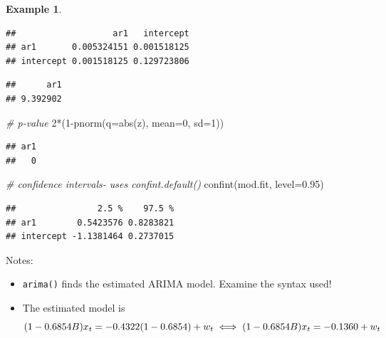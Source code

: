 \documentclass[
]{book}
\newenvironment{Shaded}{\begin{snugshade}}{\end{snugshade}}
\newcommand{\AttributeTok}[1]{\textcolor[rgb]{0.77,0.63,0.00}{#1}}
\newcommand{\CommentTok}[1]{\textcolor[rgb]{0.56,0.35,0.01}{\textit{#1}}}
\newcommand{\DecValTok}[1]{\textcolor[rgb]{0.00,0.00,0.81}{#1}}
\newcommand{\FloatTok}[1]{\textcolor[rgb]{0.00,0.00,0.81}{#1}}
\newcommand{\FunctionTok}[1]{\textcolor[rgb]{0.00,0.00,0.00}{#1}}
\newcommand{\NormalTok}[1]{#1}
\newcommand{\OtherTok}[1]{\textcolor[rgb]{0.56,0.35,0.01}{#1}}
\newcommand{\SpecialCharTok}[1]{\textcolor[rgb]{0.00,0.00,0.00}{#1}}
\providecommand{\tightlist}{%
  \setlength{\itemsep}{0pt}\setlength{\parskip}{0pt}}
\theoremstyle{definition}
\theoremstyle{definition}
\newtheorem{example}{Example}[chapter]
\theoremstyle{definition}
\theoremstyle{definition}
\theoremstyle{remark}
\begin{document}
\begin{example}
\begin{verbatim}
##                   ar1   intercept
## ar1       0.005324151 0.001518125
## intercept 0.001518125 0.129723806
\end{verbatim}

\begin{Shaded}
\end{Shaded}

\begin{verbatim}
##      ar1 
## 9.392902
\end{verbatim}

\begin{Shaded}
\begin{Highlighting}[]
\CommentTok{\# p{-}value}
\DecValTok{2}\SpecialCharTok{*}\NormalTok{(}\DecValTok{1}\SpecialCharTok{{-}}\FunctionTok{pnorm}\NormalTok{(}\AttributeTok{q=}\FunctionTok{abs}\NormalTok{(z), }\AttributeTok{mean=}\DecValTok{0}\NormalTok{, }\AttributeTok{sd=}\DecValTok{1}\NormalTok{))}
\end{Highlighting}
\end{Shaded}

\begin{verbatim}
## ar1 
##   0
\end{verbatim}

\begin{Shaded}
\begin{Highlighting}[]
\CommentTok{\# confidence intervals{-} uses confint.default()}
\FunctionTok{confint}\NormalTok{(mod.fit, }\AttributeTok{level=}\FloatTok{0.95}\NormalTok{)}
\end{Highlighting}
\end{Shaded}

\begin{verbatim}
##                2.5 %    97.5 %
## ar1        0.5423576 0.8283821
## intercept -1.1381464 0.2737015
\end{verbatim}

\end{example}

Notes:

\begin{itemize}
\tightlist
\item
  \texttt{arima()} finds the estimated ARIMA model. Examine the syntax used!
\item
  The estimated model is \[(1-0.6854B)x_t=-0.4322(1-0.6854)+w_t\\
  \iff (1-0.6854B)x_t=-0.1360+w_t\]
\end{itemize}
\end{document}
